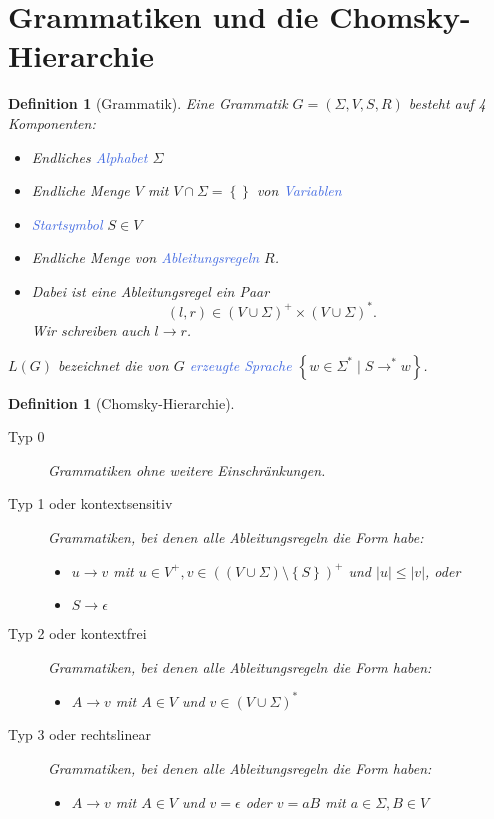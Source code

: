 \documentclass[11pt]{scrartcl}
\newcommand{\tcol}[1]{\textcolor{RoyalBlue}{#1}}
\newcommand{\set}[1]{\left\lbrace #1\right\rbrace}
\theoremstyle{break}
\newtheorem{defi}[satz]{Definition}
\begin{document}
    \section{Grammatiken und die Chomsky-Hierarchie}
	\label{sec:grammatiken-und-die-chomsky-hierarchie}


    \begin{defi}[Grammatik]
        Eine Grammatik $G=(\Sigma,V,S,R)$ besteht auf 4 Komponenten:
        \begin{itemize}
            \item Endliches \tcol{Alphabet} $\Sigma$
            \item Endliche Menge $V$ mit $V\cap\Sigma=\set{}$ von \tcol{Variablen}
            \item \tcol{Startsymbol} $S\in V$
            \item Endliche Menge von \tcol{Ableitungsregeln} $R$.
            \item Dabei ist eine Ableitungsregel ein Paar \[(l,r)\in(V\cup\Sigma)^+\times(V\cup\Sigma)^*.\]
            Wir schreiben auch $l\rightarrow r$.
        \end{itemize}
        $L(G)$ bezeichnet die von $G$ \tcol{erzeugte Sprache} $\set{w\in\Sigma^*\mid S\rightarrow^*w}$.
    \end{defi}

    \begin{defi}[Chomsky-Hierarchie]
        \begin{description}
            \item[Typ 0] Grammatiken ohne weitere Einschränkungen.
            \item[Typ 1 oder kontextsensitiv] Grammatiken, bei denen alle Ableitungsregeln die Form habe:
            \begin{itemize}
                \item $u\rightarrow v$ mit $u\in V^+,v\in(\left(V\cup\Sigma\right)\setminus\set{S})^+$ und $|u|\leq |v|$, oder
                \item $S\rightarrow\epsilon$
            \end{itemize}
            \item[Typ 2 oder kontextfrei] Grammatiken, bei denen alle Ableitungsregeln die Form haben:
            \begin{itemize}
                \item $A\rightarrow v$ mit $A\in V$ und $v\in(V\cup\Sigma)^*$
            \end{itemize}
            \item[Typ 3 oder rechtslinear] Grammatiken, bei denen alle Ableitungsregeln die Form haben:
            \begin{itemize}
                \item $A\rightarrow v$ mit $A\in V$ und $v=\epsilon$ oder $v=aB$ mit $a\in\Sigma,B\in V$
            \end{itemize}
        \end{description}
    \end{defi}
\end{document}
